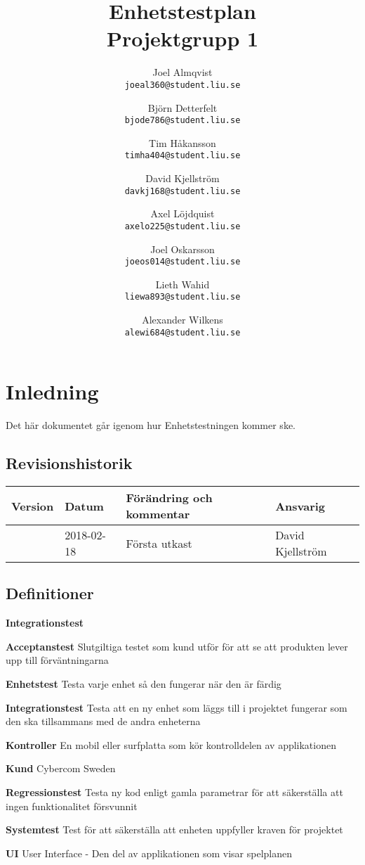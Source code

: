 \documentclass[10pt]{article}
\title{Enhetstestplan\\
    \large Projektgrupp 1}
\author{
    Joel Almqvist\\
    \texttt{joeal360@student.liu.se}
    \and
    Björn Detterfelt\\
    \texttt{bjode786@student.liu.se}
    \and
    Tim Håkansson\\
    \texttt{timha404@student.liu.se}
    \and
    David Kjellström\\
    \texttt{davkj168@student.liu.se}
    \and
    Axel Löjdquist\\
    \texttt{axelo225@student.liu.se}
    \and
    Joel Oskarsson\\
    \texttt{joeos014@student.liu.se}
    \and
    Lieth Wahid\\
    \texttt{liewa893@student.liu.se}
    \and
    Alexander Wilkens\\
    \texttt{alewi684@student.liu.se}
}
\begin{document}
\maketitle
\pagebreak
\tableofcontents
\pagebreak

\section{Inledning}
	Det här dokumentet går igenom hur Enhetstestningen kommer ske.
	\subsection{Revisionshistorik}

	
	\begin{center}
 	   \begin{tabular}{| l | l | l |  l | }
 	       \hline
 	       \textbf{Version} & \textbf{Datum} & \textbf{Förändring och kommentar} & \textbf{Ansvarig} \\
 	       \hline
 	       \centering 0.1 & 2018-02-18 & Första utkast & David Kjellström\\
 	       \hline
 	   \end{tabular}
	\end{center}


	\subsection{Definitioner}
  \begin{labeling}{\textbf{Integrationstest}}
  \item [\textbf{Acceptanstest}]Slutgiltiga testet som kund utför för att se att produkten lever upp till förväntningarna
    \item [\textbf{Enhetstest}] Testa varje enhet så den fungerar när den är färdig
    \item [\textbf{Integrationstest}] Testa att en ny enhet som läggs till i projektet fungerar som den ska tillsammans med de andra enheterna
    \item [\textbf{Kontroller}] En mobil eller surfplatta som kör kontrolldelen av applikationen
    \item [\textbf{Kund}] Cybercom Sweden
    \item [\textbf{Regressionstest}] Testa ny kod enligt gamla parametrar för att säkerställa att ingen funktionalitet försvunnit
    \item [\textbf{Systemtest}] Test för att säkerställa att enheten uppfyller kraven för projektet		
    \item [\textbf{UI}] User Interface - Den del av applikationen som visar spelplanen
  \end{labeling}
	
\end{document}
